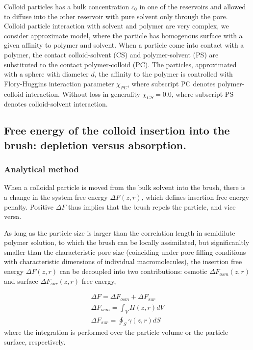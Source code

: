 \documentclass[12pt, a4paper]{article}
\begin{document}
Colloid particles has a bulk concentration $c_0$ in one of the reservoirs and allowed to diffuse into the other reservoir with pure solvent only through the pore.
Colloid particle interaction with solvent and polymer are very complex, we consider approximate model, where the particle has homogenous surface with a given affinity to polymer and solvent.
When a particle come into contact with a polymer, the contact colloid-solvent (CS) and polymer-solvent (PS) are substituted to the contact polymer-colloid (PC).
The particles, approximated with a sphere with diameter $d$, the affinity to the polymer is controlled with Flory-Huggins interaction parameter $\chi_{PC}$, 
where subscript PC denotes polymer-colloid interaction. Without loss in generality $\chi_{CS}=0.0$, where subscript PS denotes colloid-solvent interaction.



\subsection{Free energy of the colloid insertion into the brush: depletion versus absorption.}
\subsubsection*{Analytical method}

When a colloidal particle is moved from the bulk solvent into the brush, there is a change in the system free energy $\Delta F(z,r)$, which defines insertion free energy penalty. 
Positive $\Delta F$ thus implies that the brush repels the particle, and vice versa.

As long as the particle size is larger than the correlation length in semidilute polymer solution, to which the brush can be locally assimilated, but significanltly smaller than the characteristic 
pore size (coinciding under pore filling conditions with characteristic dimensions of individual macromolecules), 
the insertion free energy $\Delta F(z,r)$ can be decoupled into two contributions: osmotic $\Delta F_{osm}(z,r)$ and surface $\Delta F_{sur}(z,r)$ free energy,

\begin{eqnarray}
    \Delta F = \Delta F_{osm} + \Delta F_{sur}
    \\
    \Delta F_{osm} = \int_{V} \Pi(z,r) dV
    \\
    \Delta F_{sur} = \oint_{S} \gamma (z,r) dS
\label{Delta_F}
\end{eqnarray}
where the integration is performed over the particle volume or the particle surface, respectively.
\end{document}
